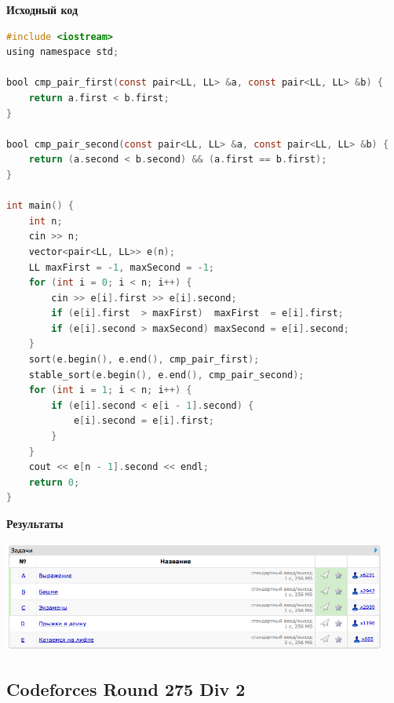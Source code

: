 \documentclass[a4paper,12pt]{article}
\begin{document}
\textbf{{\large Исходный код}}
\begin{lstlisting}[language=C]
#include <iostream>
using namespace std;

bool cmp_pair_first(const pair<LL, LL> &a, const pair<LL, LL> &b) {
    return a.first < b.first;
}

bool cmp_pair_second(const pair<LL, LL> &a, const pair<LL, LL> &b) {
    return (a.second < b.second) && (a.first == b.first);
}

int main() {
    int n;
    cin >> n;
    vector<pair<LL, LL>> e(n);
    LL maxFirst = -1, maxSecond = -1;
    for (int i = 0; i < n; i++) {
        cin >> e[i].first >> e[i].second;
        if (e[i].first  > maxFirst)  maxFirst  = e[i].first;
        if (e[i].second > maxSecond) maxSecond = e[i].second;
    }
    sort(e.begin(), e.end(), cmp_pair_first);
    stable_sort(e.begin(), e.end(), cmp_pair_second);
    for (int i = 1; i < n; i++) {
        if (e[i].second < e[i - 1].second) {
            e[i].second = e[i].first;
        }
    }
    cout << e[n - 1].second << endl;
    return 0;
}
\end{lstlisting}

\textbf{{\large Результаты}} \\
\begin{center}
\includegraphics[width=0.95\textwidth]{C_274/C_274_result.png}\\ [1cm]
\end{center}



%
%

\newpage
\subsection{Codeforces Round 275 Div 2}
\end{document}
